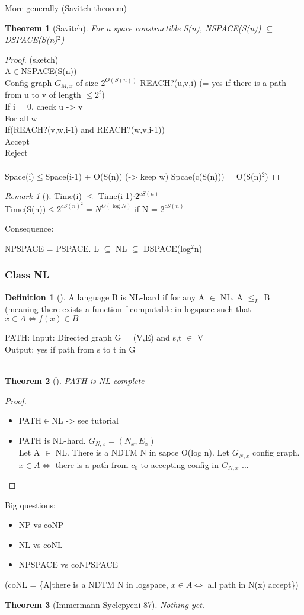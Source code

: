 \documentclass{article}
\newtheorem{theorem}{Theorem}
\theoremstyle{definition}
\newtheorem{definition}{Definition}
\theoremstyle{remark}
\newtheorem*{remark}{Remark}
\newcommand{\Thm}[3]{\begin{theorem}[#1]\label{#2}#3\end{theorem}}
\newcommand{\Def}[3]{\begin{definition}[#1]\label{#2}#3\end{definition}}
\newcommand{\Rem}[3]{\begin{remark}[#1]\label{#2}#3\end{remark}}
\newcommand{\Proof}[1]{\begin{proof}#1\end{proof}}
\begin{document}
More generally (Savitch theorem)
\Thm{Savitch}{}{For a space constructible S(n), NSPACE(S(n)) $\subseteq$ DSPACE(S(n)$^2$)}
\Proof{(sketch)\\
	A$\in$NSPACE(S(n))\\
	Config graph $G_{M,x}$ of size $2^{O(S(n))}$
	REACH?(u,v,i) (= yes if there is a path from u to v of length $\leq 2^i$)\\
		If i = 0, check u -> v\\
		For all w\\
			If(REACH?(v,w,i-1) and REACH?(w,v,i-1))\\
				Accept\\
		Reject\\\\
Space(i)$\leq$Space(i-1) + O(S(n)) (-> keep w)
Spcae(c(S(n))) = O(S(n)$^2$)
	}
	
\Rem{}{}{Time(i) $\leq$ Time(i-1)$\cdot2^{cS(n)}$\\
	Time(S(n))$\leq 2^{cS(n)^2} = N^{O(\log N)}$ if N = $2^{cS(n)}$}
	
Consequence:

NPSPACE = PSPACE. L $\subseteq$ NL $\subseteq$ DSPACE(log$^2$n)

\subsubsection{Class NL}
\Def{}{}{A language B is NL-hard if for any A $\in$ NL, A $\leq_L$ B (meaning there exists a function f computable in logspace such that $x\in A \Leftrightarrow f(x)\in B$}

PATH: Input: Directed graph G = (V,E) and s,t $\in$ V\\
Output: yes if path from s to t in G\\\\

\Thm{}{}{PATH is NL-complete}
\Proof{\begin{itemize}
		\item PATH$\in$NL -> see tutorial
		\item PATH is NL-hard. $G_{N,x} = (N_x,E_x)$\\
		Let A $\in$ NL. There is a NDTM N in sapce O(log n). Let $G_{N,x}$ config graph. $x\in A \Leftrightarrow$ there is a path from $c_0$ to accepting config in $G_{N,x}$
	...
	\end{itemize}}

Big questions: \begin{itemize}
	\item NP vs coNP
	\item NL vs coNL
	\item NPSPACE vs coNPSPACE
\end{itemize}
(coNL = \{A$|$there is a NDTM N in logspace, $x\in A \Leftrightarrow$ all path in N(x) accept\})\\

\Thm{Immermann-Syclepyeni 87}{}{Nothing yet.}
\end{document}

